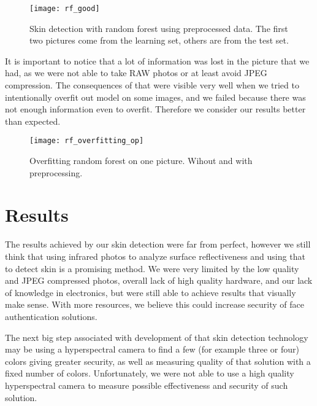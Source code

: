                 \begin{figure}[H]
                    \caption{Skin detection with random forest using preprocessed data.
                    The first two pictures come from the learning set, others
                    are from the test set.}
                    \centering
                    \texttt{[image: rf\_good]}
                    \label{fig:rf_good}
                \end{figure}

                It is important to notice that a lot of information was lost in the
                picture that we had, as we were not able to take RAW photos or at least
                avoid JPEG compression.
                The consequences of that were visible very well when we tried to
                intentionally overfit out model on some images, and we failed
                because there was not enough information even to overfit.
                Therefore we consider our results better than expected.

                 \begin{figure}[H]
                    \caption{Overfitting random forest on one picture. Wihout and with preprocessing.}
                    \centering
                    \texttt{[image: rf\_overfitting\_op]}
                    \label{fig:rf_overfitting_op}
                \end{figure}

    \section{Results}
        The results achieved by our skin detection were far from perfect,
        however we still think that using infrared photos to analyze surface
        reflectiveness and using that to detect skin is a promising method.
        We were very limited by the low quality and JPEG compressed photos,
        overall lack of high quality hardware, and our lack of knowledge in electronics,
        but were still able to achieve results that visually make sense.
        With more resources, we believe this could increase security of
        face authentication solutions.

        The next big step associated with development of that skin detection
        technology may be using a hyperspectral camera to find a few (for example three
        or four) colors giving greater security, as well as measuring
        quality of that solution with a fixed number of colors.
        Unfortunately, we were not able to use a high quality hyperspectral camera
        to measure possible effectiveness and security of such solution.

